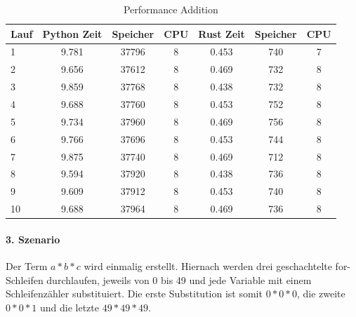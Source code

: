 \documentclass[11pt,a4paper, ngerman]{article}
\begin{document}
\begin{table}[h!]
    \caption{Performance Addition}
    \centering
    \begin{tabular}{|l|c|c|c|c|c|c|}
        \hline
        \textbf{Lauf} & \textbf{Python Zeit} & \textbf{Speicher} & \textbf{CPU} & \textbf{Rust Zeit} & \textbf{Speicher} & \textbf{CPU} \\
        \hline
        1 & 9.781 & 37796 & 8 & 0.453 & 740 & 7 \\
        \hline
        2 & 9.656 & 37612 & 8 & 0.469 & 732 & 8 \\
        \hline
        3 & 9.859 & 37768 & 8 & 0.438 & 732 & 8 \\
        \hline
        4 & 9.688 & 37760 & 8 & 0.453 & 752 & 8 \\
        \hline
        5 & 9.734 & 37960 & 8 & 0.469 & 756 & 8 \\
        \hline
        6 & 9.766 & 37696 & 8 & 0.453 & 744 & 8 \\
        \hline
        7 & 9.875 & 37740 & 8 & 0.469 & 712 & 8 \\
        \hline
        8 & 9.594 & 37920 & 8 & 0.438 & 736 & 8 \\
        \hline
        9 & 9.609 & 37912 & 8 & 0.453 & 740 & 8 \\
        \hline
        10 & 9.688 & 37964 & 8 & 0.469 & 736 & 8 \\
        \hline
    \end{tabular}
\end{table}

\paragraph{3. Szenario} Der Term $a*b*c$ wird einmalig erstellt. Hiernach werden drei geschachtelte for-Schleifen durchlaufen, jeweils von 0 bis 49 und jede Variable mit einem Schleifenzähler substituiert. Die erste Substitution ist somit $0*0*0$, die zweite $0*0*1$ und die letzte $49*49*49$.
\end{document}
